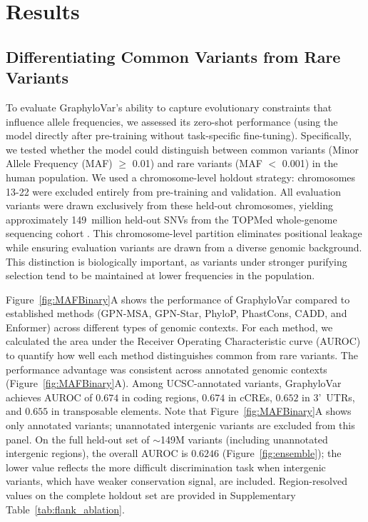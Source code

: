\documentclass[unnumsec,webpdf,contemporary,large]{oup-authoring-template}%
\newcommand{\rev}[1]{{\color{red}#1}}
\theoremstyle{thmstyleone}%
\theoremstyle{thmstyletwo}%
\theoremstyle{thmstylethree}%
\begin{document}
\section{Results}


\subsection{Differentiating Common Variants from Rare Variants}

To evaluate GraphyloVar's ability to capture evolutionary constraints that influence allele frequencies, we assessed its zero-shot performance (using the model directly after pre-training without task-specific fine-tuning). Specifically, we tested whether the model could distinguish between common variants (Minor Allele Frequency (MAF) $\geq$ 0.01) and rare variants (MAF $<$ 0.001) in the human population. We used a chromosome-level holdout strategy: chromosomes 13-22 were excluded entirely from pre-training and validation. All evaluation variants were drawn exclusively from these held-out chromosomes, yielding approximately 149~million held-out SNVs from the TOPMed whole-genome sequencing cohort \citep{burgess2021topmed}. This chromosome-level partition eliminates positional leakage while ensuring evaluation variants are drawn from a diverse genomic background. This distinction is biologically important, as variants under stronger purifying selection tend to be maintained at lower frequencies in the population.

\rev{Figure~\ref{fig:MAFBinary}A shows the performance of GraphyloVar compared to established methods (GPN-MSA, GPN-Star, PhyloP, PhastCons, CADD, and Enformer) across different types of genomic contexts. For each method, we calculated the area under the Receiver Operating Characteristic curve (AUROC) to quantify how well each method distinguishes common from rare variants.}
\rev{The performance advantage was consistent across annotated genomic contexts (Figure~\ref{fig:MAFBinary}A). Among UCSC-annotated variants, GraphyloVar achieves AUROC of $0.674$ in coding regions, $0.674$ in cCREs, $0.652$ in 3'~UTRs, and $0.655$ in transposable elements. Note that Figure~\ref{fig:MAFBinary}A shows only annotated variants; unannotated intergenic variants are excluded from this panel. On the full held-out set of $\sim$149M variants (including unannotated intergenic regions), the overall AUROC is $0.6246$ (Figure~\ref{fig:ensemble}); the lower value reflects the more difficult discrimination task when intergenic variants, which have weaker conservation signal, are included. Region-resolved values on the complete holdout set are provided in Supplementary Table~\ref{tab:flank_ablation}.}
\end{document}
